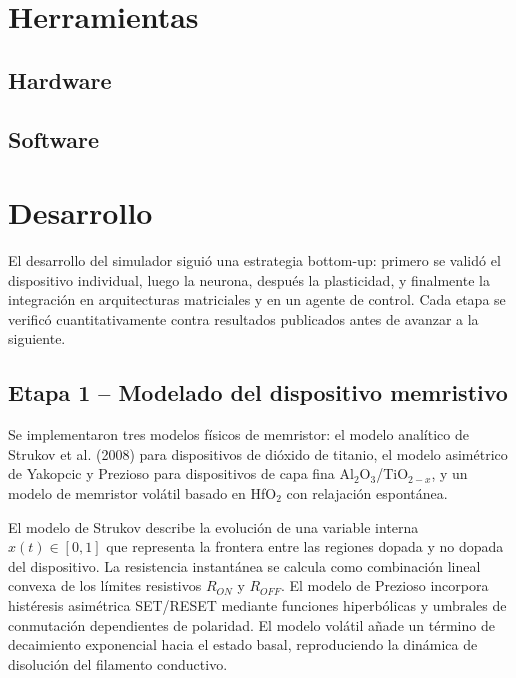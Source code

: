 \section{Herramientas}

\subsection{Hardware}

\subsection{Software}

\section{Desarrollo}
\label{sec:desarrollo}

El desarrollo del simulador siguió una estrategia bottom-up: 
primero se validó el dispositivo individual, luego la neurona, 
después la plasticidad, y finalmente la integración en 
arquitecturas matriciales y en un agente de control. Cada etapa 
se verificó cuantitativamente contra resultados publicados antes 
de avanzar a la siguiente.

\subsection{Etapa 1 -- Modelado del dispositivo memristivo}

Se implementaron tres modelos físicos de memristor: el modelo 
analítico de Strukov et al. (2008) para dispositivos de dióxido 
de titanio, el modelo asimétrico de Yakopcic y Prezioso para 
dispositivos de capa fina Al$_2$O$_3$/TiO$_{2-x}$, y un modelo 
de memristor volátil basado en HfO$_2$ con relajación espontánea.

El modelo de Strukov describe la evolución de una variable 
interna $x(t) \in [0,1]$ que representa la frontera entre las 
regiones dopada y no dopada del dispositivo. La resistencia 
instantánea se calcula como combinación lineal convexa de los 
límites resistivos $R_{ON}$ y $R_{OFF}$. El modelo de Prezioso 
incorpora histéresis asimétrica SET/RESET mediante funciones 
hiperbólicas y umbrales de conmutación dependientes de 
polaridad. El modelo volátil añade un término de decaimiento 
exponencial hacia el estado basal, reproduciendo la dinámica 
de disolución del filamento conductivo.

